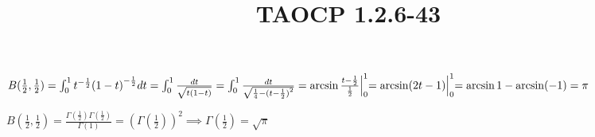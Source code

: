\documentclass{article}
\title{TAOCP 1.2.6\mbox{-}43}
\begin{document}
\maketitle

\( B(\frac{1}{2}, \frac{1}{2}) = \int_{0}^{1} t^{-\frac{1}{2}}{(1-t)}^{-\frac{1}{2}}dt = \int_{0}^{1} \frac{dt}{\sqrt{t(1-t)}} = \int_{0}^{1} \frac{dt}{\sqrt{\frac{1}{4}- {(t-\frac{1}{2})}^{2}}} = \arcsin \frac{t-\frac{1}{2}}{\frac{1}{2}} \Bigl|_{0}^{1} = \arcsin (2t-1) \Bigl|_{0}^{1} = \arcsin 1 - \arcsin (-1) = \pi \)

\( B(\frac{1}{2}, \frac{1}{2}) = \frac{\Gamma(\frac{1}{2}) \Gamma(\frac{1}{2})}{\Gamma(1)} = {(\Gamma(\frac{1}{2}))}^{2} \implies \Gamma(\frac{1}{2}) = \sqrt{\pi} \)
\end{document}
